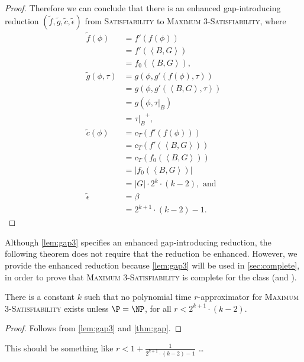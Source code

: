 \documentclass[]{article}
\newcommand{\pair}[2]{{\left\langle{#1}, {#2}\right\rangle}}
\begin{document}
\begin{proof}
  Therefore we can conclude that there is an \NC{} enhanced gap-introducing reduction $(\tilde{f}, \tilde{g}, \tilde{c}, \tilde{\epsilon})$ from \textsc{Satisfiability} to \textsc{Maximum 3-Satisfiability}, where
  \begin{align*}
    \tilde{f}(\phi) & = f'(f(\phi)) \\
    & = f'(\pair{B}{G}) \\
    & = f_0(\pair{B}{G}), \\
    \tilde{g}(\phi, \tau) & = g(\phi, g'(f(\phi), \tau)) \\
    & = g(\phi, g'(\pair{B}{G}, \tau)) \\
    & = g(\phi, \tau|_B) \\
    & = {\tau|_B}^+, \\
    \tilde{c}(\phi) & = c_T(f'(f(\phi))) \\
    & = c_T(f'(\pair{B}{G})) \\
    & = c_T(f_0(\pair{B}{G})) \\
    & = |f_0(\pair{B}{G})| \\
    & = |G| \cdot 2^k \cdot (k - 2), \text{ and} \\
    \tilde{\epsilon} & = \beta \\
    & = 2^{k + 1} \cdot (k - 2) - 1.
  \end{align*}
\end{proof}

Although \autoref{lem:gap3} specifies an enhanced gap-introducing reduction, the following theorem does not require that the reduction be enhanced.
However, we provide the enhanced reduction because \autoref{lem:gap3} will be used in \autoref{sec:complete}, in order to prove that \textsc{Maximum 3-Satisfiability} is complete for the class \APX{} (and \NCX).

\begin{theorem}\label{thm:hard}
  There is a constant $k$ such that no polynomial time $r$-approximator for \textsc{Maximum 3-Satisfiability} exists unless $\P = \NP$, for all $r < 2^{k + 1} \cdot (k - 2)$.
\end{theorem}
\begin{proof}
  Follows from \autoref{lem:gap3} and \autoref{thm:gap}.
\end{proof}

\begin{todo}
  This should be something like $r < 1 + \frac{1}{2^{k + 1} \cdot (k - 2) - 1}$ \ldots
\end{todo}
\end{document}
